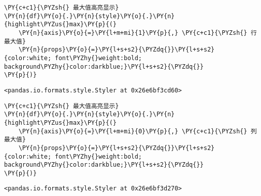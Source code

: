     \begin{tcolorbox}[breakable, size=fbox, boxrule=1pt, pad at break*=1mm,colback=cellbackground, colframe=cellborder]
\begin{Verbatim}[commandchars=\\\{\}]
\PY{c+c1}{\PYZsh{} 最大值高亮显示}
\PY{n}{df}\PY{o}{.}\PY{n}{style}\PY{o}{.}\PY{n}{highlight\PYZus{}max}\PY{p}{(}
    \PY{n}{axis}\PY{o}{=}\PY{l+m+mi}{1}\PY{p}{,} \PY{c+c1}{\PYZsh{} 行最大值}
    \PY{n}{props}\PY{o}{=}\PY{l+s+s2}{\PYZdq{}}\PY{l+s+s2}{color:white; font\PYZhy{}weight:bold; background\PYZhy{}color:darkblue;}\PY{l+s+s2}{\PYZdq{}}
\PY{p}{)}
\end{Verbatim}
\end{tcolorbox}

            \begin{tcolorbox}[breakable, size=fbox, boxrule=.5pt, pad at break*=1mm, opacityfill=0]
\begin{Verbatim}[commandchars=\\\{\}]
<pandas.io.formats.style.Styler at 0x26e6bf3cd60>
\end{Verbatim}
\end{tcolorbox}
        
    \begin{tcolorbox}[breakable, size=fbox, boxrule=1pt, pad at break*=1mm,colback=cellbackground, colframe=cellborder]
\begin{Verbatim}[commandchars=\\\{\}]
\PY{c+c1}{\PYZsh{} 最大值高亮显示}
\PY{n}{df}\PY{o}{.}\PY{n}{style}\PY{o}{.}\PY{n}{highlight\PYZus{}max}\PY{p}{(}
    \PY{n}{axis}\PY{o}{=}\PY{l+m+mi}{0}\PY{p}{,} \PY{c+c1}{\PYZsh{} 列最大值}
    \PY{n}{props}\PY{o}{=}\PY{l+s+s2}{\PYZdq{}}\PY{l+s+s2}{color:white; font\PYZhy{}weight:bold; background\PYZhy{}color:darkblue;}\PY{l+s+s2}{\PYZdq{}}
\PY{p}{)}
\end{Verbatim}
\end{tcolorbox}

            \begin{tcolorbox}[breakable, size=fbox, boxrule=.5pt, pad at break*=1mm, opacityfill=0]
\begin{Verbatim}[commandchars=\\\{\}]
<pandas.io.formats.style.Styler at 0x26e6bf3d270>
\end{Verbatim}
\end{tcolorbox}
        
